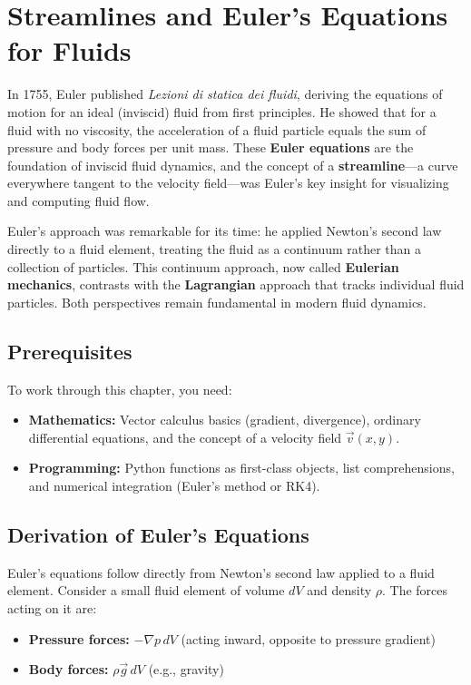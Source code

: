 
\chapter{Streamlines and Euler's Equations for Fluids}

\begin{historical}
In 1755, Euler published \emph{Lezioni di statica dei fluidi}, deriving the equations of motion for an ideal (inviscid) fluid from first principles. He showed that for a fluid with no viscosity, the acceleration of a fluid particle equals the sum of pressure and body forces per unit mass. These \textbf{Euler equations} are the foundation of inviscid fluid dynamics, and the concept of a \textbf{streamline}---a curve everywhere tangent to the velocity field---was Euler's key insight for visualizing and computing fluid flow.

Euler's approach was remarkable for its time: he applied Newton's second law directly to a fluid element, treating the fluid as a continuum rather than a collection of particles. This continuum approach, now called \textbf{Eulerian mechanics}, contrasts with the \textbf{Lagrangian} approach that tracks individual fluid particles. Both perspectives remain fundamental in modern fluid dynamics.
\end{historical}

\section{Prerequisites}

To work through this chapter, you need:
\begin{itemize}
    \item \textbf{Mathematics:} Vector calculus basics (gradient, divergence), ordinary differential equations, and the concept of a velocity field $\vec{v}(x,y)$.
    \item \textbf{Programming:} Python functions as first-class objects, list comprehensions, and numerical integration (Euler's method or RK4).
\end{itemize}

\section{Derivation of Euler's Equations}

Euler's equations follow directly from Newton's second law applied to a fluid element.
Consider a small fluid element of volume $dV$ and density $\rho$. The forces acting on it are:
\begin{itemize}
    \item \textbf{Pressure forces:} $-\nabla p \, dV$ (acting inward, opposite to pressure gradient)
    \item \textbf{Body forces:} $\rho \vec{g} \, dV$ (e.g., gravity)
\end{itemize}

